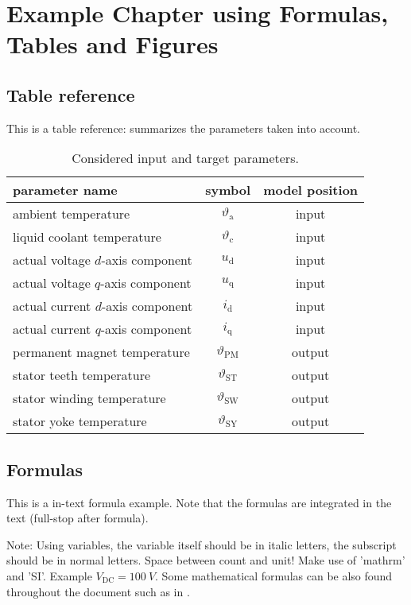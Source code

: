 \chapter{Example Chapter using Formulas, Tables and Figures} 
\label{cha:derivation}

\section{Table reference}
\label{sec:features}
This is a table reference:
 summarizes the parameters taken into account.
\begin{table}
	\caption{Considered input and target parameters.}
	\label{tab:params}
	\centering
	\begin{tabular}{l c c}
		\toprule
		parameter name & symbol & model position \\
		\midrule
		ambient temperature & $\vartheta_\mathrm{a}$ & input \\
		liquid coolant temperature & $\vartheta_\mathrm{c}$ & input \\
		actual voltage $d$-axis component & $u_\mathrm{d}$ & input \\
		actual voltage $q$-axis component & $u_\mathrm{q}$ & input \\
		actual current $d$-axis component & $i_\mathrm{d}$ & input \\
		actual current $q$-axis component & $i_\mathrm{q}$ & input \\
		\hline
		permanent magnet temperature & $\vartheta_{\mathrm{PM}}$ & output \\
		stator teeth temperature & $\vartheta_{\mathrm{ST}}$ & output \\
		stator winding temperature & $\vartheta_{\mathrm{SW}}$ & output \\
		stator yoke temperature & $\vartheta_{\mathrm{SY}}$ & output\\
		\bottomrule
	 \end{tabular}
\end{table}


\section{Formulas}
\label{subsec:normalization}
This is a in-text formula example. Note that the formulas are integrated in the text (full-stop after formula).

Note: Using variables, the variable itself should be in italic letters, the subscript should be in normal letters. Space between count and unit! Make use of 'mathrm' and 'SI'. Example $V_\mathrm{DC} = \SI{100}{V}$. Some mathematical formulas can be also found throughout the document such as in .

